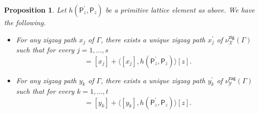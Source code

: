 \documentclass[pdftex]{sigma}%
\numberwithin{equation}{section}
\numberwithin{figure}{section}
\numberwithin{table}{section}
\newtheorem{Proposition}[Theorem]{Proposition}
 { \theoremstyle{definition}
\newtheorem{Definition}[Theorem]{Definition}
\newtheorem{Note}[Theorem]{Note}
\newtheorem{Example}[Theorem]{Example}
\newtheorem{Remark}[Theorem]{Remark}
\newtheorem{observation}[Theorem]{Observation}
\newtheorem{operation}[Theorem]{Operation}
\newtheorem{setting}[Theorem]{Setting}}
\newcommand{\calX}{\mathcal{X}}
\newcommand{\calY}{\mathcal{Y}}
\newcommand{\sfP}{\mathsf{P}}
\newcommand{\zig}{\mathsf{zig}}
\newcommand{\zag}{\mathsf{zag}}
\begin{document}
\begin{Proposition}\label{zigzag_afterdeform2}
Let $h(\sfP^\prime_z,\sfP_z)$ be a primitive lattice element as above.
We have the following.
\begin{itemize}\itemsep=0pt
\item[\rm (1)] For any zigzag path $x_j$ of $\Gamma$,
there exists a unique zigzag path $x_j^\prime$ of $\nu^\zig_\calX(\Gamma)$ such that for every $j=1,\dots,s$
\begin{displaymath}
[x^{\prime}_j]=[x_j]+\langle [x_j],h(\sfP_z^\prime,\sfP_z)\rangle[z].
\end{displaymath}
\item[\rm (2)] For any zigzag path $y_k$ of $\Gamma$, there exists a unique zigzag path $y_k^\prime$ of $\nu^\zag_\calY(\Gamma)$ such that for every $k=1,\dots,t$
\begin{displaymath}
[y^{\prime}_k]=[y_k]+\langle [y_k],h(\sfP_z^\prime,\sfP_z)\rangle[z].
\end{displaymath}
\end{itemize}
\end{Proposition}
\end{document}
